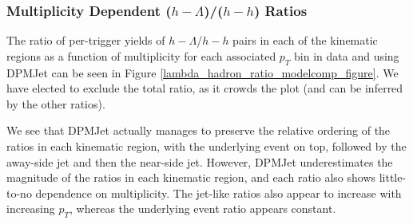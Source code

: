 \documentclass[ALICE,manyauthors]{ALICE_analysis_notes}
\begin{document}
\subsubsection{Multiplicity Dependent ($h-\Lambda$)/($h-h$) Ratios}
\label{lambda_hadron_ratio_modelcomp}

The ratio of per-trigger yields of $h-\Lambda$/$h-h$ pairs in each of the kinematic regions as a function of multiplicity for each associated $p_{T}$ bin in data and using DPMJet can be seen in Figure \ref{lambda_hadron_ratio_modelcomp_figure}. We have elected to exclude the total ratio, as it crowds the plot (and can be inferred by the other ratios). 

We see that DPMJet actually manages to preserve the relative ordering of the ratios in each kinematic region, with the underlying event on top, followed by the away-side jet and then the near-side jet. However, DPMJet underestimates the magnitude of the ratios in each kinematic region, and each ratio also shows little-to-no dependence on multiplicity. The jet-like ratios also appear to increase with increasing $p_{T}$, whereas the underlying event ratio appears constant.
\end{document}

